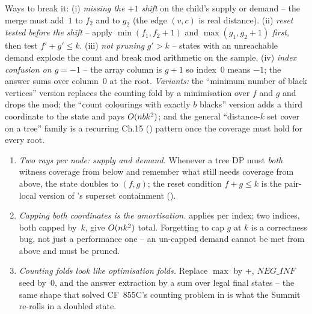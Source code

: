 \begin{warningbox}
Ways to break it: (i) \emph{missing the $+1$ shift} on the child's supply or demand
-- the merge must add~$1$ to $f_2$ and to $g_2$ (the edge $(v, c)$ is real distance).
(ii) \emph{reset tested before the shift} -- apply $\min(f_1, f_2+1)$ and
$\max(g_1, g_2+1)$ \emph{first}, then test $f' + g' \le k$. (iii) \emph{not pruning}
$g' > k$ -- states with an unreachable demand explode the count and break mod
arithmetic on the sample. (iv) \emph{index confusion on $g = -1$} -- the array
column is $g+1$ so index~$0$ means $-1$; the answer sums over column~$0$ at the root.
\emph{Variants:} the ``minimum number of black vertices'' version replaces the counting
fold by a minimisation over $f$ and $g$ and drops the mod; the ``count colourings with
exactly $b$ blacks'' version adds a third coordinate to the state and pays
$O(n b k^2)$; and the general ``distance-$k$ set cover on a tree'' family is a
recurring Ch.15 () pattern once the coverage must hold for every root.
\end{warningbox}

\begin{insightbox}
\begin{enumerate}[nosep, leftmargin=1.6em]
  \item \emph{Two rays per node: supply and demand.} Whenever a tree DP
        must \emph{both} witness coverage from below and remember what still
        needs coverage from above, the state doubles to $(f, g)$; the reset
        condition $f + g \le k$ is the pair-local version of
        's superset containment ().
  \item \emph{Capping both coordinates is the amortisation.}
         applies per index; two indices, both capped by~$k$,
        give $O(n k^2)$ total. Forgetting to cap $g$ at $k$ is a
        correctness bug, not just a performance one -- an un-capped demand
        cannot be met from above and must be pruned.
  \item \emph{Counting folds look like optimisation folds.} Replace $\max$
        by $+$, $\mathit{NEG\_INF}$ seed by~$0$, and the answer extraction
        by a sum over legal final states -- the same 
        shape that solved CF~855C's counting problem in 
        is what the Summit re-rolls in a doubled state.
\end{enumerate}
\end{insightbox}

